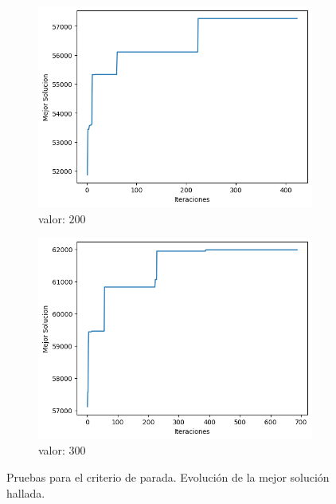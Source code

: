 \documentclass[a4paper,12pt]{article}
\begin{document}
\begin{figure}[H]
\begin{subfigure}{0.24\textwidth}
			\includegraphics[width=\textwidth]{include/parada/200/f_ast.png}
			\caption{valor: $200$}
		\end{subfigure}
		\hfill
		\begin{subfigure}{0.24\textwidth}
			\centering
			\includegraphics[width=\textwidth]{include/parada/300/f_ast.png}
			\caption{valor: $300$}
		\end{subfigure}
		\caption{Pruebas para el criterio de parada. Evolución de la mejor solución hallada.}
	\end{figure}
\end{document}
